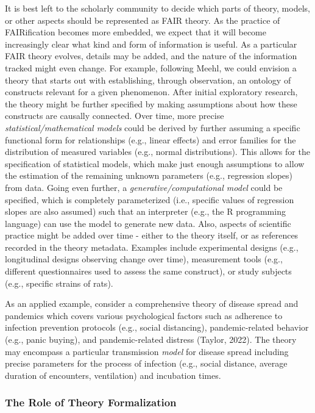 \documentclass[
  man, noextraspace,floatsintext]{apa7}
\begin{document}
It is best left to the scholarly community to decide which parts of theory, models, or other aspects should be represented as FAIR theory.
As the practice of FAIRification becomes more embedded,
we expect that it will become increasingly clear what kind and form of information is useful.
As a particular FAIR theory evolves, details may be added, and the nature of the information tracked might even change.
For example, following Meehl, we could envision a theory that starts out with establishing, through observation, an ontology of constructs relevant for a given phenomenon.
After initial exploratory research, the theory might be further specified by making assumptions about how these constructs are causally connected.
Over time, more precise \emph{statistical/mathematical models} could be derived by further assuming a specific functional form for relationships (e.g., linear effects) and error families for the distribution of measured variables (e.g., normal distributions).
This allows for the specification of statistical models, which make just enough assumptions to allow the estimation of the remaining unknown parameters (e.g., regression slopes) from data.
Going even further, a \emph{generative/computational model} could be specified,
which is completely parameterized (i.e., specific values of regression slopes are also assumed) such that an interpreter (e.g., the R programming language) can use the model to generate new data.
Also, aspects of scientific practice might be added over time - either to the theory itself, or as references recorded in the theory metadata.
Examples include experimental designs (e.g., longitudinal designs observing change over time), measurement tools (e.g., different questionnaires used to assess the same construct), or study subjects (e.g., specific strains of rats).

As an applied example, consider a comprehensive theory of disease spread and pandemics which covers various psychological factors
such as adherence to infection prevention protocols (e.g., social distancing),
pandemic-related behavior (e.g., panic buying),
and pandemic-related distress
(Taylor, 2022).
The theory may encompass a particular transmission \emph{model} for disease spread including precise parameters for the process of infection (e.g., social distance, average duration of encounters, ventilation) and incubation times.

\subsubsection{The Role of Theory Formalization}\label{the-role-of-theory-formalization}
\end{document}
